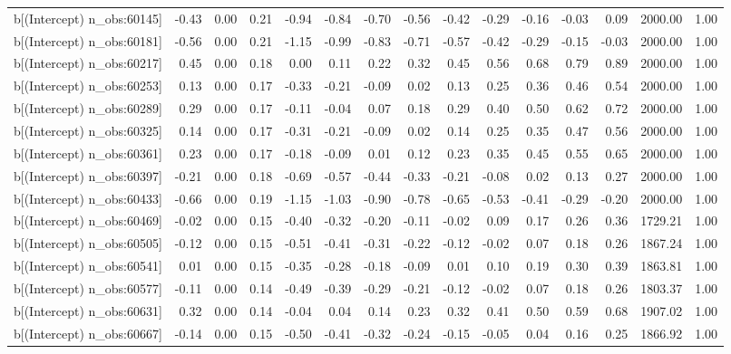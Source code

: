 \begin{table}[ht]
\begin{tabular}{rrrrrrrrrrrrrrr}
  b[(Intercept) n\_obs:60145] & -0.43 & 0.00 & 0.21 & -0.94 & -0.84 & -0.70 & -0.56 & -0.42 & -0.29 & -0.16 & -0.03 & 0.09 & 2000.00 & 1.00 \\ 
  b[(Intercept) n\_obs:60181] & -0.56 & 0.00 & 0.21 & -1.15 & -0.99 & -0.83 & -0.71 & -0.57 & -0.42 & -0.29 & -0.15 & -0.03 & 2000.00 & 1.00 \\ 
  b[(Intercept) n\_obs:60217] & 0.45 & 0.00 & 0.18 & 0.00 & 0.11 & 0.22 & 0.32 & 0.45 & 0.56 & 0.68 & 0.79 & 0.89 & 2000.00 & 1.00 \\ 
  b[(Intercept) n\_obs:60253] & 0.13 & 0.00 & 0.17 & -0.33 & -0.21 & -0.09 & 0.02 & 0.13 & 0.25 & 0.36 & 0.46 & 0.54 & 2000.00 & 1.00 \\ 
  b[(Intercept) n\_obs:60289] & 0.29 & 0.00 & 0.17 & -0.11 & -0.04 & 0.07 & 0.18 & 0.29 & 0.40 & 0.50 & 0.62 & 0.72 & 2000.00 & 1.00 \\ 
  b[(Intercept) n\_obs:60325] & 0.14 & 0.00 & 0.17 & -0.31 & -0.21 & -0.09 & 0.02 & 0.14 & 0.25 & 0.35 & 0.47 & 0.56 & 2000.00 & 1.00 \\ 
  b[(Intercept) n\_obs:60361] & 0.23 & 0.00 & 0.17 & -0.18 & -0.09 & 0.01 & 0.12 & 0.23 & 0.35 & 0.45 & 0.55 & 0.65 & 2000.00 & 1.00 \\ 
  b[(Intercept) n\_obs:60397] & -0.21 & 0.00 & 0.18 & -0.69 & -0.57 & -0.44 & -0.33 & -0.21 & -0.08 & 0.02 & 0.13 & 0.27 & 2000.00 & 1.00 \\ 
  b[(Intercept) n\_obs:60433] & -0.66 & 0.00 & 0.19 & -1.15 & -1.03 & -0.90 & -0.78 & -0.65 & -0.53 & -0.41 & -0.29 & -0.20 & 2000.00 & 1.00 \\ 
  b[(Intercept) n\_obs:60469] & -0.02 & 0.00 & 0.15 & -0.40 & -0.32 & -0.20 & -0.11 & -0.02 & 0.09 & 0.17 & 0.26 & 0.36 & 1729.21 & 1.00 \\ 
  b[(Intercept) n\_obs:60505] & -0.12 & 0.00 & 0.15 & -0.51 & -0.41 & -0.31 & -0.22 & -0.12 & -0.02 & 0.07 & 0.18 & 0.26 & 1867.24 & 1.00 \\ 
  b[(Intercept) n\_obs:60541] & 0.01 & 0.00 & 0.15 & -0.35 & -0.28 & -0.18 & -0.09 & 0.01 & 0.10 & 0.19 & 0.30 & 0.39 & 1863.81 & 1.00 \\ 
  b[(Intercept) n\_obs:60577] & -0.11 & 0.00 & 0.14 & -0.49 & -0.39 & -0.29 & -0.21 & -0.12 & -0.02 & 0.07 & 0.18 & 0.26 & 1803.37 & 1.00 \\ 
  b[(Intercept) n\_obs:60631] & 0.32 & 0.00 & 0.14 & -0.04 & 0.04 & 0.14 & 0.23 & 0.32 & 0.41 & 0.50 & 0.59 & 0.68 & 1907.02 & 1.00 \\ 
  b[(Intercept) n\_obs:60667] & -0.14 & 0.00 & 0.15 & -0.50 & -0.41 & -0.32 & -0.24 & -0.15 & -0.05 & 0.04 & 0.16 & 0.25 & 1866.92 & 1.00 \\ 

\end{tabular}
\end{table}
